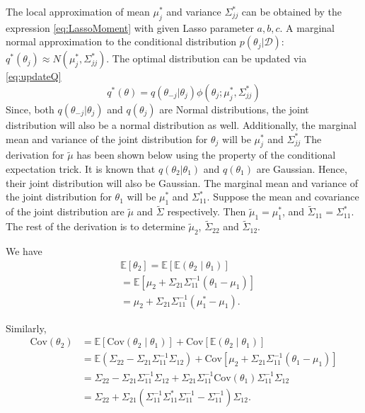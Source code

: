 The local approximation of mean $\mu_j^*$ and variance $\Sigma_{jj}^*$ can be obtained by the expression \autoref{eq:LassoMoment} with given Lasso parameter $a,b,c$. A marginal normal approximation to the conditional distribution $p(\theta_j|\mathcal{D})$: $q^*(\theta_j) \approx N(\mu_j^*,\Sigma_{jj}^*)$. 
The optimal distribution can be updated via \autoref{eq:updateQ}
\begin{equation}
	\label{eq:updateQ}
	q^*(\theta) = q(\theta_{-j}|\theta_j)\phi(\theta_j;\mu_j^*,\Sigma_{jj}^*)
\end{equation} 
Since, both $q(\theta_{-j}|\theta_j)$ and $q(\theta_j)$ are Normal distributions, the joint distribution will also be a normal distribution as well.
Additionally, the marginal mean and variance of the joint distribution for $\theta_j$ will be $\mu_j^*$ and $\Sigma_{jj}^*$
The derivation for $\tilde{\mu}$ has been shown below using the property of the conditional expectation trick.
It is known that $q(\theta_2|\theta_1)$ and $q(\theta_1)$ are Gaussian. Hence, their joint distribution will also be Gaussian. The marginal 
mean and variance of the joint distribution for $\theta_1$ will be $\mu_1^*$
and $\Sigma_{11}^*$. Suppose the mean and covariance of the joint distribution
are $\widetilde{\mu}$ and $\widetilde{\Sigma}$ respectively. Then
$\widetilde{\mu}_1 = \mu_1^*$, and $\widetilde{\Sigma}_{11} = \Sigma_{11}^*$.
The rest of the derivation is to determine $\widetilde{\mu}_{2}$, $\widetilde{\Sigma}_{22}$
and $\widetilde{\Sigma}_{12}$.

\bigskip 
\noindent We have
$$
\begin{array}{rl}
	& \mathbb{E}[\theta_2] = \mathbb{E}[\mathbb{E}(\theta_2\mid\theta_1)] 
	\\ [1ex]
	&  = \mathbb{E}[\mu_2 + \Sigma_{21}\Sigma_{11}^{-1}\left(\theta_1 - \mu_1\right)]
	\\ [1ex]
	& = \mu_2 + \Sigma_{21}\Sigma_{11}^{-1}\left(\mu_1^* - \mu_1\right).
\end{array} 
$$

\noindent Similarly,
$$
\begin{array}{rl}
	\mbox{Cov}(\theta_2) 
	&  = \mathbb{E}[\mbox{Cov}(\theta_2\mid\theta_1)] + \mbox{Cov}[\mathbb{E}(\theta_2\mid\theta_1)] 
	\\ [2ex]
	&  = \mathbb{E}(\Sigma_{22} - \Sigma_{21} \Sigma_{11}^{-1}\Sigma_{12}) + \mbox{Cov}[\mu_2 + \Sigma_{21}\Sigma_{11}^{-1}\left(\theta_1 - \mu_1\right)] 
	\\ [2ex]
	&  = \Sigma_{22} - \Sigma_{21} \Sigma_{11}^{-1}\Sigma_{12}
	+ \Sigma_{21}\Sigma_{11}^{-1}  \mbox{Cov}(\theta_1) \Sigma_{11}^{-1}  \Sigma_{12}
	\\ [2ex]
	&  =  \Sigma_{22} 
	+ \Sigma_{21}(\Sigma_{11}^{-1}  \Sigma_{11}^* \Sigma_{11}^{-1} -\Sigma_{11}^{-1})  \Sigma_{12}.
\end{array} 
$$

